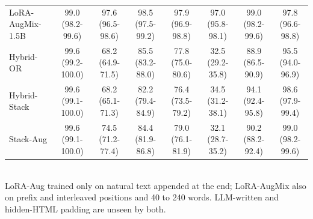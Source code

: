 \begin{table}[t]
\begin{tabular}{lccccccc}
LoRA-AugMix-1.5B & 99.0 (98.2-99.6) & 97.6 (96.5-98.6) & 98.5 (97.5-99.2) & 97.9 (96.9-98.8) & 97.0 (95.8-98.1) & 99.0 (98.2-99.6) & 97.8 (96.6-98.8) \\
Hybrid-OR & 99.6 (99.2-100.0) & 68.2 (64.9-71.5) & 85.5 (83.2-88.0) & 77.8 (75.0-80.6) & 32.5 (29.2-35.8) & 88.9 (86.5-90.9) & 95.5 (94.0-96.9) \\
Hybrid-Stack & 99.6 (99.1-100.0) & 68.2 (65.1-71.3) & 82.2 (79.4-84.9) & 76.4 (73.5-79.2) & 34.5 (31.2-38.1) & 94.1 (92.4-95.8) & 98.6 (97.9-99.4) \\
Stack-Aug & 99.6 (99.1-100.0) & 74.5 (71.2-77.4) & 84.4 (81.9-86.8) & 79.0 (76.1-81.9) & 32.1 (28.7-35.2) & 90.2 (88.2-92.4) & 99.0 (98.2-99.6) \\
\bottomrule
\end{tabular}
\\[2pt]{\scriptsize LoRA-Aug trained only on natural text appended at the end; LoRA-AugMix also on prefix and interleaved positions and 40 to 240 words. LLM-written and hidden-HTML padding are unseen by both.}
\end{table}